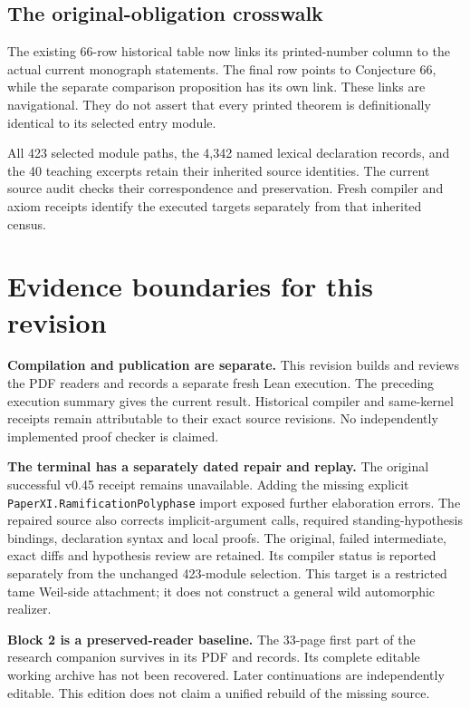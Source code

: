 \subsection*{The original-obligation crosswalk}
The existing 66-row historical table now links its printed-number column to the actual current monograph statements. The final row points to Conjecture 66, while the separate comparison proposition has its own link. These links are navigational. They do not assert that every printed theorem is definitionally identical to its selected entry module.

All 423 selected module paths, the 4,342 named lexical declaration records, and the 40 teaching excerpts retain their inherited source identities. The current source audit checks their correspondence and preservation. Fresh compiler and axiom receipts identify the executed targets separately from that inherited census.
\clearpage
\section*{Evidence boundaries for this revision}
{}
\textbf{Compilation and publication are separate.} This revision builds and reviews the PDF readers and records a separate fresh Lean execution. The preceding execution summary gives the current result. Historical compiler and same-kernel receipts remain attributable to their exact source revisions. No independently implemented proof checker is claimed.

\textbf{The terminal has a separately dated repair and replay.} The original successful v0.45 receipt remains unavailable. Adding the missing explicit \nolinkurl{PaperXI.RamificationPolyphase} import exposed further elaboration errors. The repaired source also corrects implicit-argument calls, required standing-hypothesis bindings, declaration syntax and local proofs. The original, failed intermediate, exact diffs and hypothesis review are retained. Its compiler status is reported separately from the unchanged 423-module selection. This target is a restricted tame Weil-side attachment; it does not construct a general wild automorphic realizer.

\textbf{Block 2 is a preserved-reader baseline.} The 33-page first part of the research companion survives in its PDF and records. Its complete editable working archive has not been recovered. Later continuations are independently editable. This edition does not claim a unified rebuild of the missing source.

